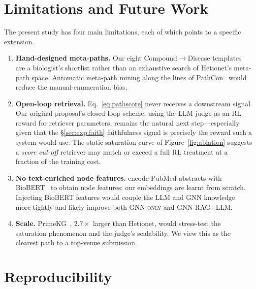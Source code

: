 \documentclass{article}
\newcommand{\ours}{\textsc{GNN-RAG+LLM}\xspace}
\newcommand{\gnno}{\textsc{GNN-only}\xspace}
\begin{document}
\section{Limitations and Future Work}
\label{sec:fut}

The present study has four main limitations, each of which points to a specific extension.

\begin{enumerate}[label=(\roman*)]
    \item \textbf{Hand-designed meta-paths.} Our eight Compound$\to$Disease templates are a biologist's shortlist rather than an exhaustive search of Hetionet's meta-path space. Automatic meta-path mining along the lines of PathCon~\citep{wang2021pathcon} would reduce the manual-enumeration bias.
    \item \textbf{Open-loop retrieval.} Eq.~\eqref{eq:pathscore} never receives a downstream signal. Our original proposal's closed-loop scheme, using the LLM judge as an RL reward for retriever parameters, remains the natural next step---especially given that the \S\ref{sec:exp:faith} faithfulness signal is precisely the reward such a system would use. The static saturation curve of Figure~\ref{fig:ablation} suggests a \emph{score cut-off} retriever may match or exceed a full RL treatment at a fraction of the training cost.
    \item \textbf{No text-enriched node features.} \citet{hays2026raggnn} encode PubMed abstracts with BioBERT~\citep{lee2020biobert} to obtain node features; our embeddings are learnt from scratch. Injecting BioBERT features would couple the LLM and GNN knowledge more tightly and likely improve both \gnno and \ours.
    \item \textbf{Scale.} PrimeKG~\citep{chandak2022primekg}, $2.7\times$ larger than Hetionet, would stress-test the saturation phenomenon and the judge's scalability. We view this as the clearest path to a top-venue submission.
\end{enumerate}

\section{Reproducibility}
\label{sec:reproducibility}
\end{document}

